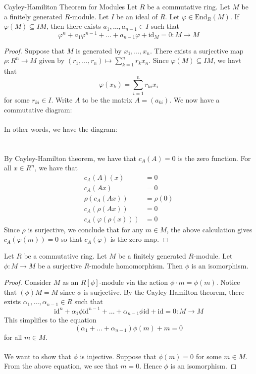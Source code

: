 \documentclass[a4paper]{article}
\begin{document}
\begin{thm}{Cayley-Hamiliton Theorem for Modules}{} Let $R$ be a commutative ring. Let $M$ be a finitely generated $R$-module. Let $I$ be an ideal of $R$. Let $\varphi\in\text{End}_R(M)$. If $\varphi(M)\subseteq IM$, then there exists $a_1,\dots,a_{n-1}\in I$ such that $$\varphi^n+a_1\varphi^{n-1}+\dots+a_{n-1}\varphi+\text{id}_M=0:M\to M$$ 
\begin{proof}
Suppose that $M$ is generated by $x_1,\dots,x_n$. There exists a surjective map $\rho:R^n\to M$ given by $(r_1,\dots,r_n)\mapsto\sum_{k=1}^nr_kx_n$. Since $\varphi(M)\subseteq IM$, we havt that $$\varphi(x_k)=\sum_{i=1}^nr_{ki}x_i$$ for some $r_{ki}\in I$. Write $A$ to be the matrix $A=(a_{ki})$. We now have a commutative diagram: \\~\\
In other words, we have the diagram: \\
\\~\\
By Cayley-Hamilton theorem, we have that $c_A(A)=0$ is the zero function. For all $x\in R^n$, we have that 
\begin{align*}
c_A(A)(x)&=0\\
c_A(Ax)&=0\\
\rho(c_A(Ax))&=\rho(0)\\
c_A(\rho(Ax))&=0\tag{$\rho$ is $R$-linear}\\
c_A(\varphi(\rho(x)))&=0\tag{Diagram is commutative}
\end{align*}
Since $\rho$ is surjective, we conclude that for any $m\in M$, the above calculation gives $c_A(\varphi(m))=0$ so that $c_A(\varphi)$ is the zero map. 
\end{proof}
\end{thm}

\begin{prp}{}{} Let $R$ be a commutative ring. Let $M$ be a finitely generated $R$-module. Let $\phi:M\to M$ be a surjective $R$-module homomorphism. Then $\phi$ is an isomorphism. 
\begin{proof}
Consider $M$ as an $R[\phi]$-module via the action $\phi\cdot m=\phi(m)$. Notice that $(\phi)M=M$ since $\phi$ is surjective. By the Cayley-Hamilton theorem, there exists $\alpha_1,\dots,\alpha_{n-1}\in R$ such that $$\text{id}^n+\alpha_1\phi\text{id}^{n-1}+\dots+\alpha_{n-1}\phi\text{id}+\text{id}=0:M\to M$$ This simplifies to the equation $$(\alpha_1+\dots+\alpha_{n-1})\phi(m)+m=0$$ for all $m\in M$. \\~\\

We want to show that $\phi$ is injective. Suppose that $\phi(m)=0$ for some $m\in M$. From the above equation, we see that $m=0$. Hence $\phi$ is an isomorphism. 
\end{proof}
\end{prp}
\end{document}
